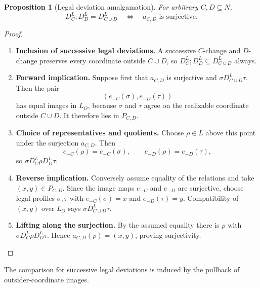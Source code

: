 \documentclass[11pt,a4paper]{article}
\numberwithin{equation}{section}
\newtheorem{proposition}[theorem]{Proposition}
\theoremstyle{definition}
\theoremstyle{remark}
\theoremstyle{plain}
\begin{document}
\begin{proposition}[Legal deviation amalgamation]
\label{prop:egt-legal-deviation-amalgamation}
For arbitrary $C,D\subseteq N$,
\[
 D_C^L;D_D^L=D_{C\cup D}^L
 \quad\Longleftrightarrow\quad
 a_{C,D}\text{ is surjective}.
\]
\end{proposition}
\begin{proof}
\leavevmode
\begin{enumerate}[label=\textup{(\arabic*)},leftmargin=*,itemsep=4pt,topsep=3pt]
  \item \textbf{Inclusion of successive legal deviations.} A successive $C$-change and $D$-change preserves every coordinate outside
$C\cup D$, so
$D_C^L;D_D^L\subseteq D_{C\cup D}^L$ always.
  \item \textbf{Forward implication.} Suppose first that $a_{C,D}$ is surjective and
$\sigma D_{C\cup D}^L\tau$. Then the pair
\[
 (e_{-C}(\sigma),e_{-D}(\tau))
\]
has equal images in $L_O$, because $\sigma$ and $\tau$ agree on the
realizable coordinate outside $C\cup D$. It therefore lies in $P_{C,D}$.
  \item \textbf{Choice of representatives and quotients.} Choose $\rho\in L$ above this point under the surjection $a_{C,D}$. Then
\[
 e_{-C}(\rho)=e_{-C}(\sigma),
 \qquad
 e_{-D}(\rho)=e_{-D}(\tau),
\]
so $\sigma D_C^L\rho D_D^L\tau$.
  \item \textbf{Reverse implication.} Conversely assume equality of the relations and take
$(x,y)\in P_{C,D}$. Since the image maps $e_{-C}$ and $e_{-D}$ are
surjective, choose legal profiles $\sigma,\tau$ with
$e_{-C}(\sigma)=x$ and $e_{-D}(\tau)=y$. Compatibility of $(x,y)$ over
$L_O$ says $\sigma D_{C\cup D}^L\tau$.
  \item \textbf{Lifting along the surjection.} By the assumed equality there is
$\rho$ with $\sigma D_C^L\rho D_D^L\tau$. Hence
$a_{C,D}(\rho)=(x,y)$, proving surjectivity.
\end{enumerate}
\end{proof}

\noindent The comparison for successive legal deviations is induced by the pullback of outsider-coordinate images.
\begin{center}
\end{center}
\end{document}
